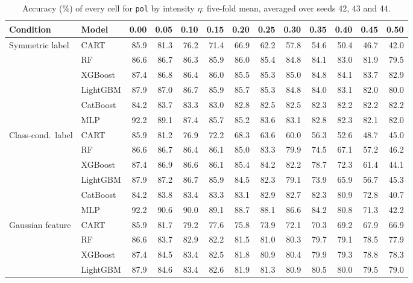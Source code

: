 \begin{table}[p]
\centering
\tiny
\setlength{\tabcolsep}{2.6pt}
\caption{Accuracy (\%) of every cell for \texttt{pol} by intensity $\eta$: five-fold mean, averaged over seeds 42, 43 and 44.}
\label{tab:grid_pol}
\begin{tabular}{@{}llrrrrrrrrrrr@{}}
\toprule
Condition & Model & 0.00 & 0.05 & 0.10 & 0.15 & 0.20 & 0.25 & 0.30 & 0.35 & 0.40 & 0.45 & 0.50 \\
\midrule
Symmetric label & CART & 85.9 & 81.3 & 76.2 & 71.4 & 66.9 & 62.2 & 57.8 & 54.6 & 50.4 & 46.7 & 42.0 \\
 & RF & 86.6 & 86.7 & 86.3 & 85.9 & 86.0 & 85.4 & 84.8 & 84.1 & 83.0 & 81.9 & 79.5 \\
 & XGBoost & 87.4 & 86.8 & 86.4 & 86.0 & 85.5 & 85.3 & 85.0 & 84.8 & 84.1 & 83.7 & 82.9 \\
 & LightGBM & 87.9 & 87.0 & 86.7 & 85.9 & 85.7 & 85.3 & 84.8 & 84.0 & 83.1 & 82.0 & 80.0 \\
 & CatBoost & 84.2 & 83.7 & 83.3 & 83.0 & 82.8 & 82.5 & 82.5 & 82.3 & 82.2 & 82.2 & 82.2 \\
 & MLP & 92.2 & 89.1 & 87.4 & 85.7 & 85.2 & 83.6 & 83.1 & 82.8 & 82.3 & 82.1 & 82.0 \\
\midrule
Class-cond.\ label & CART & 85.9 & 81.2 & 76.9 & 72.2 & 68.3 & 63.6 & 60.0 & 56.3 & 52.6 & 48.7 & 45.0 \\
 & RF & 86.6 & 86.7 & 86.4 & 86.1 & 85.0 & 83.3 & 79.9 & 74.5 & 67.1 & 57.2 & 46.2 \\
 & XGBoost & 87.4 & 86.9 & 86.6 & 86.1 & 85.4 & 84.2 & 82.2 & 78.7 & 72.3 & 61.4 & 44.1 \\
 & LightGBM & 87.9 & 87.2 & 86.7 & 85.9 & 84.5 & 82.3 & 79.1 & 73.9 & 65.9 & 56.7 & 45.3 \\
 & CatBoost & 84.2 & 83.8 & 83.4 & 83.3 & 83.1 & 82.9 & 82.7 & 82.3 & 80.9 & 72.8 & 40.7 \\
 & MLP & 92.2 & 90.6 & 90.0 & 89.1 & 88.7 & 88.1 & 86.6 & 84.2 & 80.8 & 71.3 & 42.2 \\
\midrule
Gaussian feature & CART & 85.9 & 81.7 & 79.2 & 77.6 & 75.8 & 73.9 & 72.1 & 70.3 & 69.2 & 67.9 & 66.9 \\
 & RF & 86.6 & 83.7 & 82.9 & 82.2 & 81.5 & 81.0 & 80.3 & 79.7 & 79.1 & 78.5 & 77.9 \\
 & XGBoost & 87.4 & 84.5 & 83.4 & 82.5 & 81.8 & 80.9 & 80.4 & 79.9 & 79.3 & 78.8 & 78.3 \\
 & LightGBM & 87.9 & 84.6 & 83.4 & 82.6 & 81.9 & 81.3 & 80.9 & 80.5 & 80.0 & 79.5 & 79.0 \\

\end{tabular}
\end{table}
